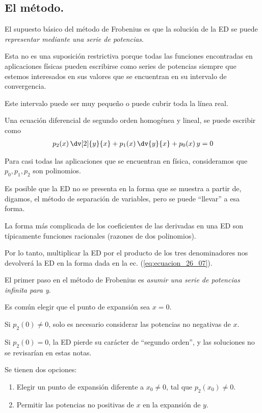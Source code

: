 \subsection{El método.}

El supuesto básico del método de Frobenius es que la solución de la ED se puede \emph{representar mediante una serie de potencias}.

Esta no es una suposición restrictiva porque todas las funciones encontradas en aplicaciones físicas pueden escribirse como series de potencias siempre que estemos interesados en sus valores que se encuentran en su intervalo de convergencia.

Este intervalo puede ser muy pequeño o puede cubrir toda la línea real.

Una ecuación diferencial de segundo orden homogénea y lineal, se puede escribir como
\begin{align}
p_{2} (x) \, \dv[2]{y}{x} + p_{1} (x) \, \dv{y}{x} + p_{0}(x) \, y = 0
\label{eq:ecuacion_26_07}    
\end{align}

Para casi todas las aplicaciones que se encuentran en física, consideramos que $p_{0}, p_{1}, p_{2}$ son polinomios.

Es posible que la ED no se presenta en la forma que se muestra a partir de, digamos, el método de separación de variables, pero se puede \enquote{llevar} a esa forma.

La forma más complicada de los coeficientes de las derivadas en una ED son típicamente funciones racionales (razones de dos polinomios).

Por lo tanto, multiplicar la ED por el producto de los tres denominadores nos devolverá la ED en la forma dada en la ec. (\ref{eq:ecuacion_26_07}).

El primer paso en el método de Frobenius es \emph{asumir una serie de potencias infinita para y}.

Es común elegir que el punto de expansión sea $x = 0$.

Si $p_{2} (0) \neq 0$, solo es necesario considerar las potencias no negativas de $x$.

Si $p_{2} (0) = 0$, la ED pierde su carácter de \enquote{segundo orden}, y las soluciones no se revisarían en estas notas.

Se tienen dos opciones:
\begin{enumerate}
\item Elegir un punto de expansión diferente a $x_{0} \neq 0$, tal que $p_{2} (x_{0}) \neq 0$.
\item Permitir las potencias no positivas de $x$ en la expansión de $y$.
\end{enumerate}

